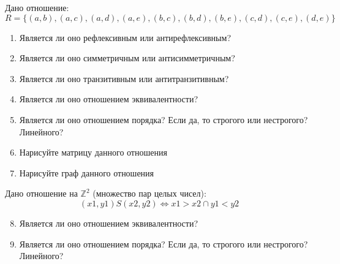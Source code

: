 \documentclass[russian,12pt]{article}
\begin{document}
\vspace{12pt}

Дано отношение:
$$R = \{(a, b), (a, c), (a, d), (a, e), (b, c), (b, d), (b, e), (c, d), (c, e), (d, e)\}$$
\begin{enumerate}
\item Является ли оно рефлексивным или антирефлексивным?
\item Является ли оно симметричным или антисимметричным?
\item Является ли оно транзитивным или антитранзитивным?
\item Является ли оно отношением эквивалентности?
\item Является ли оно отношением порядка? Если да, то строгого или нестрогого? Линейного?
\item Нарисуйте матрицу данного отношения
\item Нарисуйте граф данного отношения
\end{enumerate}

Дано отношение на $\mathbb{Z}^2$ (множество пар целых чисел):
$$(x1, y1)S(x2, y2) \iff x1 > x2 \cap y1 < y2$$
\begin{enumerate}
\setcounter{enumi}{7}
\item Является ли оно отношением эквивалентности?
\item Является ли оно отношением порядка? Если да, то строгого или нестрогого? Линейного?
\end{enumerate}
\newpage
\end{document}
